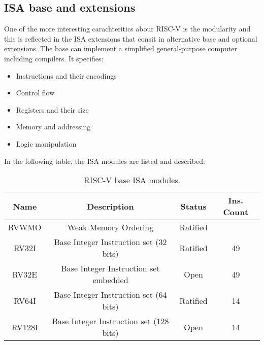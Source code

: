 \subsection{ISA base and extensions} 
One of the more interesting carachteritics abour RISC-V is the modularity and this is reflected in the ISA extensions that consit in alternative base  and optional extensions. The base can implement a simplified general-purpose computer including compilers. It specifies: 

\begin{itemize}
	\item Instructions and their encodings
	\item Control flow
	\item Registers and their size
	\item Memory and addressing
	\item Logic manipulation
\end{itemize}

In the following table, the ISA modules are listed and described:

\begin{table}[H]
\centering
\begin{tabular}{|c|c|c|c|}
\hline
\textbf{Name} & \textbf{Description} & \textbf{Status}  & \textbf{Ins. Count}  \\ \hline

RVWMO & Weak Memory Ordering & Ratified & \\ \hline
RV32I & Base Integer Instruction set (32 bits) & Ratified & 49 \\ \hline
RV32E & Base Integer Instruction set embedded & Open & 49 \\ \hline
RV64I & Base Integer Instruction set (64 bits) & Ratified & 14 \\ \hline
RV128I & Base Integer Instruction set (128 bits) & Open & 14 \\ \hline

\end{tabular}
\caption{RISC-V base ISA modules.} 
\end{table}


